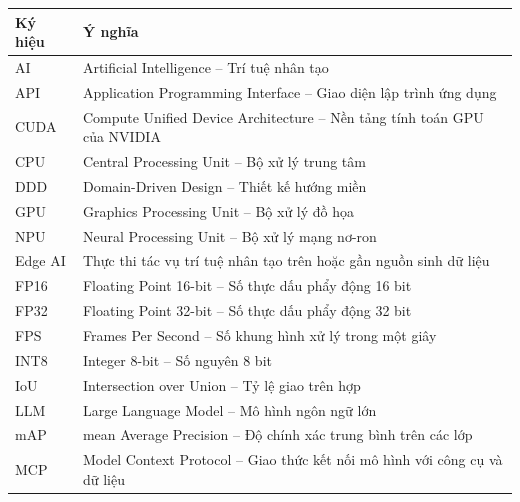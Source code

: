 \renewcommand{\contentsname}{Mục lục}
\tableofcontents

\renewcommand{\listfigurename}{Danh sách hình vẽ}
\listoffigures

\renewcommand{\listtablename}{Danh sách bảng}
\listoftables

\begin{longtable}{L{2.6cm}L{11.5cm}}
\toprule
\textbf{Ký hiệu} & \textbf{Ý nghĩa}\\
\midrule\endhead
AI      & Artificial Intelligence -- Trí tuệ nhân tạo\\
API     & Application Programming Interface -- Giao diện lập trình ứng dụng\\
CUDA    & Compute Unified Device Architecture -- Nền tảng tính toán GPU của NVIDIA\\
CPU     & Central Processing Unit -- Bộ xử lý trung tâm\\
DDD     & Domain-Driven Design -- Thiết kế hướng miền\\
GPU     & Graphics Processing Unit -- Bộ xử lý đồ họa\\
NPU     & Neural Processing Unit -- Bộ xử lý mạng nơ-ron\\
Edge AI & Thực thi tác vụ trí tuệ nhân tạo trên hoặc gần nguồn sinh dữ liệu\\
FP16    & Floating Point 16-bit -- Số thực dấu phẩy động 16 bit\\
FP32    & Floating Point 32-bit -- Số thực dấu phẩy động 32 bit\\
FPS     & Frames Per Second -- Số khung hình xử lý trong một giây\\
INT8    & Integer 8-bit -- Số nguyên 8 bit\\
IoU     & Intersection over Union -- Tỷ lệ giao trên hợp\\
LLM     & Large Language Model -- Mô hình ngôn ngữ lớn\\
mAP     & mean Average Precision -- Độ chính xác trung bình trên các lớp\\
MCP     & Model Context Protocol -- Giao thức kết nối mô hình với công cụ và dữ liệu\\

\end{longtable}
